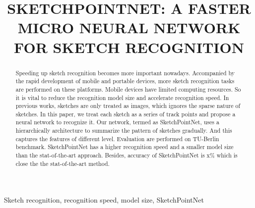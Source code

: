 \documentclass{article}
\title{SKETCHPOINTNET: A FASTER MICRO NEURAL NETWORK FOR SKETCH RECOGNITION}
\begin{document}
%
\maketitle
%
\begin{abstract}
Speeding up sketch recognition becomes more important nowadays. Accompanied by the rapid development of mobile and portable devices, more sketch recognition tasks are performed on these platforms. Mobile devices have limited computing resources. So it is vital to reduce the recognition model size and accelerate recognition speed. In previous works, sketches are only treated as images, which ignores the sparse nature of sketches. In this paper, we treat each sketch as a series of track points and propose a neural network to recognize it. Our network, termed as SketchPointNet, uses a hierarchically architecture to summarize the pattern of sketches gradually. And this captures the features of different level. Evaluation are performed on TU-Berlin benchmark. SketchPointNet has a higher recognition speed and a smaller model size than the stat-of-the-art approach. Besides, accuracy of SketchPointNet is x\% which is close the the stat-of-the-art method.
\end{abstract}

\begin{keywords}
Sketch recognition, recognition speed, model size, SketchPointNet
\end{keywords}







\end{document}
